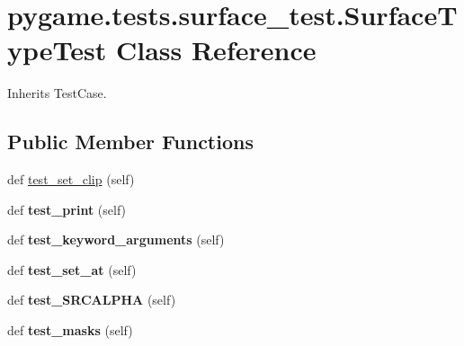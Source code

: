 \hypertarget{classpygame_1_1tests_1_1surface__test_1_1_surface_type_test}{}\section{pygame.\+tests.\+surface\+\_\+test.\+Surface\+Type\+Test Class Reference}
\label{classpygame_1_1tests_1_1surface__test_1_1_surface_type_test}


Inherits Test\+Case.

\subsection*{Public Member Functions}
\begin{DoxyCompactItemize}
\item 
def \hyperlink{classpygame_1_1tests_1_1surface__test_1_1_surface_type_test_a3ee8a6793e1a0d1b79356b7927a786a9}{test\+\_\+set\+\_\+clip} (self)
\item 
\mbox{\label{classpygame_1_1tests_1_1surface__test_1_1_surface_type_test_aaa8122e03e26c20a628471c8060944f5}} 
def {\bfseries test\+\_\+print} (self)
\item 
\mbox{\label{classpygame_1_1tests_1_1surface__test_1_1_surface_type_test_acc849f0f0b88665f02af50833bf608a3}} 
def {\bfseries test\+\_\+keyword\+\_\+arguments} (self)
\item 
\mbox{\label{classpygame_1_1tests_1_1surface__test_1_1_surface_type_test_aad1ca28079a36dc7eb8364598951f1e9}} 
def {\bfseries test\+\_\+set\+\_\+at} (self)
\item 
\mbox{\label{classpygame_1_1tests_1_1surface__test_1_1_surface_type_test_a752490b55c6a256a06750fe26074d002}} 
def {\bfseries test\+\_\+\+S\+R\+C\+A\+L\+P\+HA} (self)
\item 
\mbox{\label{classpygame_1_1tests_1_1surface__test_1_1_surface_type_test_a79f14a5134b4bda5784988f8da7eb17d}} 
def {\bfseries test\+\_\+masks} (self)

\end{DoxyCompactItemize}
